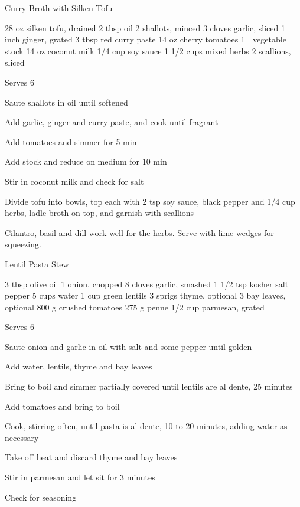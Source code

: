 \begin{denserecipe}{Curry Broth with Silken Tofu}{\vegetarian{}}
\begin{ingredients}
28 oz silken tofu, drained
2 tbsp oil
2 shallots, minced
3 cloves garlic, sliced
1 inch ginger, grated
3 tbsp red curry paste
14 oz cherry tomatoes
1 l vegetable stock
14 oz coconut milk
1/4 cup soy sauce
1 1/2 cups mixed herbs
2 scallions, sliced
\end{ingredients}
\nextcolumn
Serves 6
\begin{steps}
    \item Saute shallots in oil until softened
    \item Add garlic, ginger and curry paste, and cook until fragrant
    \item Add tomatoes and simmer for 5 min
    \item Add stock and reduce on medium for 10 min
    \item Stir in coconut milk and check for salt
    \item Divide tofu into bowls, top each with 2 tsp soy sauce, black pepper and 1/4 cup herbs, ladle broth on top, and garnish with scallions
\end{steps}
Cilantro, basil and dill work well for the herbs. Serve with lime wedges for squeezing.
\end{denserecipe}

\begin{denserecipe}{Lentil Pasta Stew}{\vegetarian{}}
\begin{ingredients}
3 tbsp olive oil
1 onion, chopped
8 cloves garlic, smashed
1 1/2 tsp kosher salt
pepper
5 cups water
1 cup green lentils
3 sprigs thyme, optional
3 bay leaves, optional
800 g crushed tomatoes
275 g penne
1/2 cup parmesan, grated
\end{ingredients}
\nextcolumn
Serves 6
\begin{steps}
    \item Saute onion and garlic in oil with salt and some pepper until golden
    \item Add water, lentils, thyme and bay leaves
    \item Bring to boil and simmer partially covered until lentils are al dente, 25 minutes
    \item Add tomatoes and bring to boil
    \item Cook, stirring often, until pasta is al dente, 10 to 20 minutes, adding water as necessary
    \item Take off heat and discard thyme and bay leaves
    \item Stir in parmesan and let sit for 3 minutes
    \item Check for seasoning
\end{steps}
\end{denserecipe}

